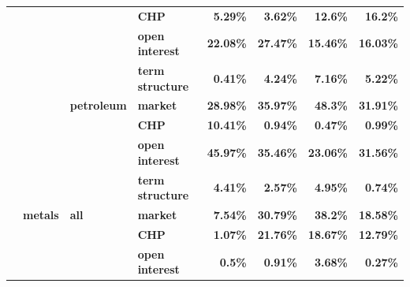 \documentclass[
  authoryear,
  preprint,
  3p]{elsarticle}
\begin{document}
\begin{longtable}[t]{>{}l>{}l>{}l>{}l>{}r>{}r>{}r>{}r}
\textbf{} & \textbf{} & \textbf{} & \textbf{CHP} & \textcolor[HTML]{4285f4}{\textbf{5.29\%}} & \textcolor[HTML]{4285f4}{\textbf{3.62\%}} & \textcolor[HTML]{4285f4}{\textbf{12.6\%}} & \textcolor[HTML]{4285f4}{\textbf{16.2\%}}\\
\addlinespace
\textbf{} & \textbf{} & \textbf{} & \textbf{open interest} & \textcolor[HTML]{4285f4}{\textbf{22.08\%}} & \textcolor[HTML]{4285f4}{\textbf{27.47\%}} & \textcolor[HTML]{4285f4}{\textbf{15.46\%}} & \textcolor[HTML]{4285f4}{\textbf{16.03\%}}\\
\textbf{} & \textbf{} & \textbf{} & \textbf{term structure} & \textcolor[HTML]{4285f4}{\textbf{0.41\%}} & \textcolor[HTML]{4285f4}{\textbf{4.24\%}} & \textcolor[HTML]{4285f4}{\textbf{7.16\%}} & \textcolor[HTML]{4285f4}{\textbf{5.22\%}}\\
\textbf{} & \textbf{} & \textbf{petroleum} & \textbf{market} & \textcolor[HTML]{4285f4}{\textbf{28.98\%}} & \textcolor[HTML]{4285f4}{\textbf{35.97\%}} & \textcolor[HTML]{4285f4}{\textbf{48.3\%}} & \textcolor[HTML]{4285f4}{\textbf{31.91\%}}\\
\textbf{} & \textbf{} & \textbf{} & \textbf{CHP} & \textcolor[HTML]{4285f4}{\textbf{10.41\%}} & \textcolor[HTML]{4285f4}{\textbf{0.94\%}} & \textcolor[HTML]{4285f4}{\textbf{0.47\%}} & \textcolor[HTML]{4285f4}{\textbf{0.99\%}}\\
\textbf{} & \textbf{} & \textbf{} & \textbf{open interest} & \textcolor[HTML]{4285f4}{\textbf{45.97\%}} & \textcolor[HTML]{4285f4}{\textbf{35.46\%}} & \textcolor[HTML]{4285f4}{\textbf{23.06\%}} & \textcolor[HTML]{4285f4}{\textbf{31.56\%}}\\
\addlinespace
\textbf{} & \textbf{} & \textbf{} & \textbf{term structure} & \textcolor[HTML]{4285f4}{\textbf{4.41\%}} & \textcolor[HTML]{4285f4}{\textbf{2.57\%}} & \textcolor[HTML]{4285f4}{\textbf{4.95\%}} & \textcolor[HTML]{4285f4}{\textbf{0.74\%}}\\
\textbf{} & \textbf{metals} & \textbf{all} & \textbf{market} & \textcolor[HTML]{4285f4}{\textbf{7.54\%}} & \textcolor[HTML]{4285f4}{\textbf{30.79\%}} & \textcolor[HTML]{4285f4}{\textbf{38.2\%}} & \textcolor[HTML]{4285f4}{\textbf{18.58\%}}\\
\textbf{} & \textbf{} & \textbf{} & \textbf{CHP} & \textcolor[HTML]{4285f4}{\textbf{1.07\%}} & \textcolor[HTML]{4285f4}{\textbf{21.76\%}} & \textcolor[HTML]{4285f4}{\textbf{18.67\%}} & \textcolor[HTML]{4285f4}{\textbf{12.79\%}}\\
\textbf{} & \textbf{} & \textbf{} & \textbf{open interest} & \textcolor[HTML]{4285f4}{\textbf{0.5\%}} & \textcolor[HTML]{4285f4}{\textbf{0.91\%}} & \textcolor[HTML]{4285f4}{\textbf{3.68\%}} & \textcolor[HTML]{4285f4}{\textbf{0.27\%}}\\

\end{longtable}
\end{document}
